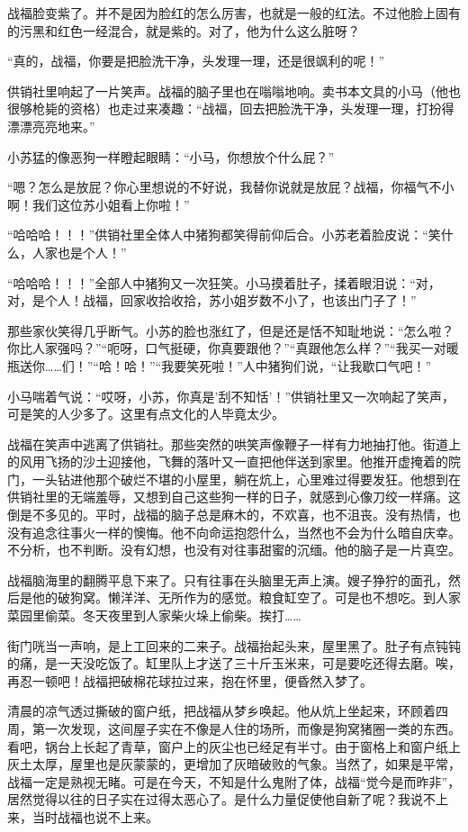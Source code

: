 战福脸变紫了。并不是因为脸红的怎么厉害，也就是一般的红法。不过他脸上固有的污黑和红色一经混合，就是紫的。对了，他为什么这么脏呀？ 

“真的，战福，你要是把脸洗干净，头发理一理，还是很飒利的呢！” 

供销社里响起了一片笑声。战福的脑子里也在嗡嗡地响。卖书本文具的小马（他也很够枪毙的资格）也走过来凑趣：“战福，回去把脸洗干净，头发理一理，打扮得漂漂亮亮地来。” 

小苏猛的像恶狗一样瞪起眼睛：“小马，你想放个什么屁？” 

“嗯？怎么是放屁？你心里想说的不好说，我替你说就是放屁？战福，你福气不小啊！我们这位苏小姐看上你啦！” 

“哈哈哈！！！”供销社里全体人中猪狗都笑得前仰后合。小苏老着脸皮说：“笑什么，人家也是个人！” 

“哈哈哈！！！”全部人中猪狗又一次狂笑。小马摸着肚子，揉着眼泪说：“对，对，是个人！战福，回家收拾收拾，苏小姐岁数不小了，也该出门子了！” 

那些家伙笑得几乎断气。小苏的脸也涨红了，但是还是恬不知耻地说：“怎么啦？你比人家强吗？”“呃呀，口气挺硬，你真要跟他？”“真跟他怎么样？”“我买一对暖瓶送你……们！”“哈！哈！”“我要笑死啦！”人中猪狗们说，“让我歇口气吧！” 

小马喘着气说：“哎呀，小苏，你真是'刮不知恬'！”供销社里又一次响起了笑声，可是笑的人少多了。这里有点文化的人毕竟太少。 

战福在笑声中逃离了供销社。那些突然的哄笑声像鞭子一样有力地抽打他。街道上的风用飞扬的沙土迎接他，飞舞的落叶又一直把他伴送到家里。他推开虚掩着的院门，一头钻进他那个破烂不堪的小屋里，躺在炕上，心里难过得要发狂。他想到在供销社里的无端羞辱，又想到自己这些狗一样的日子，就感到心像刀绞一样痛。这倒是不多见的。平时，战福的脑子总是麻木的，不欢喜，也不沮丧。没有热情，也没有追念往事火一样的懊悔。他不向命运抱怨什么，当然也不会为什么暗自庆幸。不分析，也不判断。没有幻想，也没有对往事甜蜜的沉缅。他的脑子是一片真空。 

战福脑海里的翻腾平息下来了。只有往事在头脑里无声上演。嫂子狰狞的面孔，然后是他的破狗窝。懒洋洋、无所作为的感觉。粮食缸空了。可是也不想吃。到人家菜园里偷菜。冬天夜里到人家柴火垛上偷柴。挨打…… 

街门咣当一声响，是上工回来的二来子。战福抬起头来，屋里黑了。肚子有点钝钝的痛，是一天没吃饭了。缸里队上才送了三十斤玉米来，可是要吃还得去磨。唉，再忍一顿吧！战福把破棉花球拉过来，抱在怀里，便昏然入梦了。 

清晨的凉气透过撕破的窗户纸，把战福从梦乡唤起。他从炕上坐起来，环顾着四周，第一次发现，这间屋子实在不像是人住的场所，而像是狗窝猪圈一类的东西。看吧，锅台上长起了青草，窗户上的灰尘也已经足有半寸。由于窗格上和窗户纸上灰土太厚，屋里也是灰蒙蒙的，更增加了灰暗破败的气象。当然了，如果是平常，战福一定是熟视无睹。可是在今天，不知是什么鬼附了体，战福“觉今是而昨非”，居然觉得以往的日子实在过得太恶心了。是什么力量促使他自新了呢？我说不上来，当时战福也说不上来。 

